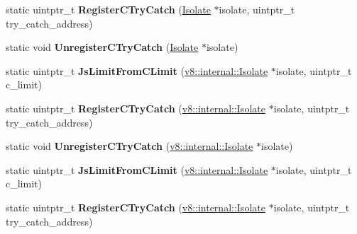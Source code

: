 \begin{DoxyCompactItemize}
\item 
static uintptr\+\_\+t {\bfseries Register\+C\+Try\+Catch} (\hyperlink{classv8_1_1internal_1_1_isolate}{Isolate} $\ast$isolate, uintptr\+\_\+t try\+\_\+catch\+\_\+address)\hypertarget{classv8_1_1internal_1_1_simulator_stack_aa65ef6412ce0b3fd2c27fa870162524b}{}\label{classv8_1_1internal_1_1_simulator_stack_aa65ef6412ce0b3fd2c27fa870162524b}

\item 
static void {\bfseries Unregister\+C\+Try\+Catch} (\hyperlink{classv8_1_1internal_1_1_isolate}{Isolate} $\ast$isolate)\hypertarget{classv8_1_1internal_1_1_simulator_stack_a88b1641de138b2d8eb764f9d71f601c8}{}\label{classv8_1_1internal_1_1_simulator_stack_a88b1641de138b2d8eb764f9d71f601c8}

\item 
static uintptr\+\_\+t {\bfseries Js\+Limit\+From\+C\+Limit} (\hyperlink{classv8_1_1internal_1_1_isolate}{v8\+::internal\+::\+Isolate} $\ast$isolate, uintptr\+\_\+t c\+\_\+limit)\hypertarget{classv8_1_1internal_1_1_simulator_stack_af21f3a7909fe2ca5760b1cfe192f9fef}{}\label{classv8_1_1internal_1_1_simulator_stack_af21f3a7909fe2ca5760b1cfe192f9fef}

\item 
static uintptr\+\_\+t {\bfseries Register\+C\+Try\+Catch} (\hyperlink{classv8_1_1internal_1_1_isolate}{v8\+::internal\+::\+Isolate} $\ast$isolate, uintptr\+\_\+t try\+\_\+catch\+\_\+address)\hypertarget{classv8_1_1internal_1_1_simulator_stack_a6f431175b70dcc1afd95dcc3bc9905a7}{}\label{classv8_1_1internal_1_1_simulator_stack_a6f431175b70dcc1afd95dcc3bc9905a7}

\item 
static void {\bfseries Unregister\+C\+Try\+Catch} (\hyperlink{classv8_1_1internal_1_1_isolate}{v8\+::internal\+::\+Isolate} $\ast$isolate)\hypertarget{classv8_1_1internal_1_1_simulator_stack_aba310aee87eed385313d42cbc30dcd8a}{}\label{classv8_1_1internal_1_1_simulator_stack_aba310aee87eed385313d42cbc30dcd8a}

\item 
static uintptr\+\_\+t {\bfseries Js\+Limit\+From\+C\+Limit} (\hyperlink{classv8_1_1internal_1_1_isolate}{v8\+::internal\+::\+Isolate} $\ast$isolate, uintptr\+\_\+t c\+\_\+limit)\hypertarget{classv8_1_1internal_1_1_simulator_stack_af21f3a7909fe2ca5760b1cfe192f9fef}{}\label{classv8_1_1internal_1_1_simulator_stack_af21f3a7909fe2ca5760b1cfe192f9fef}

\item 
static uintptr\+\_\+t {\bfseries Register\+C\+Try\+Catch} (\hyperlink{classv8_1_1internal_1_1_isolate}{v8\+::internal\+::\+Isolate} $\ast$isolate, uintptr\+\_\+t try\+\_\+catch\+\_\+address)\hypertarget{classv8_1_1internal_1_1_simulator_stack_a6f431175b70dcc1afd95dcc3bc9905a7}{}\label{classv8_1_1internal_1_1_simulator_stack_a6f431175b70dcc1afd95dcc3bc9905a7}


\end{DoxyCompactItemize}
